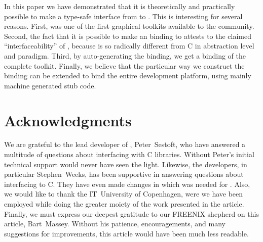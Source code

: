 \documentclass[finalversion]{usetex-v1}
\begin{document}

In this paper we have demonstrated that it is theoretically and
practically possible to make a type-safe interface from \sml to \gtk.
This is interesting for several reasons. First, \mgtk was one of the
first graphical toolkits available to the \sml community. Second, the
fact that it is possible to make an \sml binding to \gtk
attests to the claimed ``interfaceability'' of \gtk, because \sml is so
radically different from C in abstraction level and paradigm. Third,
by auto-generating the binding, we get a binding of the complete \gtk
toolkit. Finally, we believe that the particular way we construct the
binding can be extended to bind the
entire \gnome development platform, using mainly machine generated
stub code.


\section{Acknowledgments}
\label{sec:acknowledgments}

We are grateful to the lead developer of \mosml, Peter~Sestoft, who
have answered a multitude of questions about interfacing \mosml with C
libraries.  Without Peter's initial technical support \mgtk would
never have seen the light.  Likewise, the \mlton developers, in
particular Stephen~Weeks, has been supportive in answering questions
about interfacing \mlton to C.  They have even made changes in \mlton
which was needed for \mgtk.  Also, we would like to thank the
IT~University of Copenhagen, were we have been employed while doing the
greater moiety of the work presented in the article.  Finally, we
must express our deepest gratitude to our FREENIX shepherd on this
article, Bart~Massey.  Without his patience, encouragements, and many
suggestions for improvements, this article would have been much less
readable.




\end{document}
